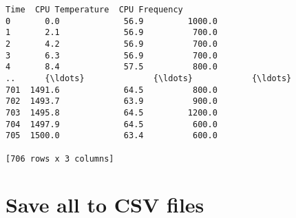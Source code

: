 \documentclass[11pt]{article}
\begin{document}
    
    \begin{Verbatim}[commandchars=\\\{\}]
       Time  CPU Temperature  CPU Frequency
0       0.0             56.9         1000.0
1       2.1             56.9          700.0
2       4.2             56.9          700.0
3       6.3             56.9          700.0
4       8.4             57.5          800.0
..      {\ldots}              {\ldots}            {\ldots}
701  1491.6             64.5          800.0
702  1493.7             63.9          900.0
703  1495.8             64.5         1200.0
704  1497.9             64.5          600.0
705  1500.0             63.4          600.0

[706 rows x 3 columns]
    \end{Verbatim}

    
    \hypertarget{save-all-to-csv-files}{%
\section{Save all to CSV files}\label{save-all-to-csv-files}}
\end{document}
